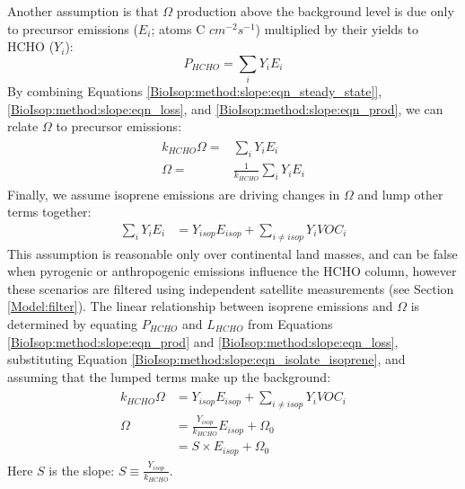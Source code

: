    Another assumption is that $\Omega$ production above the background level is due only to precursor emissions ($E_i$; atoms C $cm^{-2} s^{-1}$) multiplied by their yields to HCHO ($Y_i$):
    \begin{equation}
      \label{BioIsop:method:slope:eqn_prod}
      P_{HCHO}  = \sum_i Y_i E_i 
    \end{equation}
    By combining Equations \ref{BioIsop:method:slope:eqn_steady_state]}, \ref{BioIsop:method:slope:eqn_loss}, and \ref{BioIsop:method:slope:eqn_prod}, we can relate $\Omega$ to precursor emissions:
    \begin{eqnarray} \begin{split}
      k_{HCHO} \Omega = & \sum_i Y_i E_i \\
      \Omega = & \frac{1}{k_{HCHO}} \sum_i Y_i E_i
    \end{split} \end{eqnarray}
    Finally, we assume isoprene emissions are driving changes in $\Omega$ \parencite[as assumed elsewhere, e.g.,][]{Palmer2003,Millet2008,Marais2014,Stavrakou2015} and lump other terms together:
    \begin{eqnarray}
      \label{BioIsop:method:slope:eqn_isolate_isoprene}
      \sum_i Y_i E_i  & = Y_{isop} E_{isop} + \sum_{i \ne isop} Y_{i} VOC_{i} 
    \end{eqnarray}
    This assumption is reasonable only over continental land masses, and can be false when pyrogenic or anthropogenic emissions influence the HCHO column, however these scenarios are filtered using independent satellite measurements (see Section \ref{Model:filter}).
    The linear relationship between isoprene emissions and $\Omega$ is determined by equating $P_{HCHO}$ and $L_{HCHO}$ from Equations \ref{BioIsop:method:slope:eqn_prod} and \ref{BioIsop:method:slope:eqn_loss}, substituting Equation \ref{BioIsop:method:slope:eqn_isolate_isoprene}, and assuming that the lumped terms make up the background:
    \begin{eqnarray} 
      \label{BioIsop:method:slope:eqn_isop_to_hcho}
      \begin{split}
        k_{HCHO}\Omega 
        & = Y_{isop} E_{isop} + \sum_{i \ne isop} Y_{i} VOC_{i} \\
        \Omega 
        & = \frac{Y_{isop}}{k_{HCHO}} E_{isop} + \Omega_0 \\
        & = S \times E_{isop} + \Omega_0
      \end{split} 
    \end{eqnarray}
    Here $S$ is the slope: $S \equiv \frac{Y_{isop}}{k_{HCHO}}$.
    

